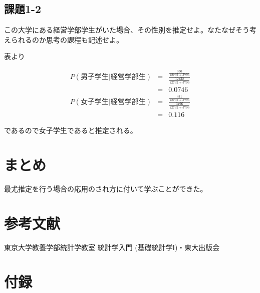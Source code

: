 \documentclass{jsarticle}
\begin{document}
      \subsection{課題1-2}
        この大学にある経営学部学生がいた場合、その性別を推定せよ。なたなぜそう考えられるのか思考の課程も記述せよ。

        表より

    \begin{eqnarray*}
      P(\mbox{男子学生} | \mbox{経営学部生}) &=& \frac{\frac{950}{12732 + 3796}}{\frac{12732}{12732 + 3796}} \\
                                             &=& 0.0746 \\
      P(\mbox{女子学生} | \mbox{経営学部生}) &=& \frac{\frac{441}{12732 + 3796}}{\frac{3796}{12732 + 3796}} \\
                                             &=& 0.116
    \end{eqnarray*}

      であるので女子学生であると推定される。


\section{まとめ}
  最尤推定を行う場合の応用のされ方に付いて学ぶことができた。

\section{参考文献}
\begin{thebibliography}{9}
   東京大学教養学部統計学教室 統計学入門 (基礎統計学Ⅰ)・東大出版会
\end{thebibliography}

\section{付録}
\end{document}
